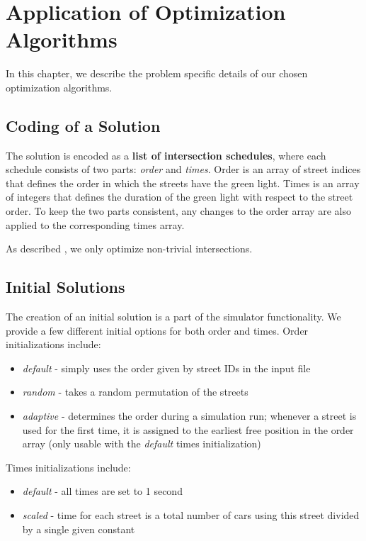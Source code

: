 \chapter{Application of Optimization Algorithms}

In this chapter, we describe the problem specific details of our chosen optimization algorithms.

\section{Coding of a Solution}

The solution is encoded as a \textbf{list of intersection schedules}, where each schedule consists of two parts: \textit{order} and \textit{times}. Order is an array of street indices that defines the order in which the streets have the green light. Times is an array of integers that defines the duration of the green light with respect to the street order. To keep the two parts consistent, any changes to the order array are also applied to the corresponding times array.

As described , we only optimize non-trivial intersections.

\section{Initial Solutions}

The creation of an initial solution is a part of the simulator functionality. We provide a few different initial options for both order and times. Order initializations include:
\begin{itemize}
    \item \textit{default} - simply uses the order given by street IDs in the input file
    \item \textit{random} - takes a random permutation of the streets
    \item \textit{adaptive} - determines the order during a simulation run; whenever a street is used for the first time, it is assigned to the earliest free position in the order array (only usable with the \textit{default} times initialization)
\end{itemize}
Times initializations include:
\begin{itemize}
    \item \textit{default} - all times are set to 1 second
    \item \textit{scaled} - time for each street is a total number of cars using this street divided by a single given constant
\end{itemize}


